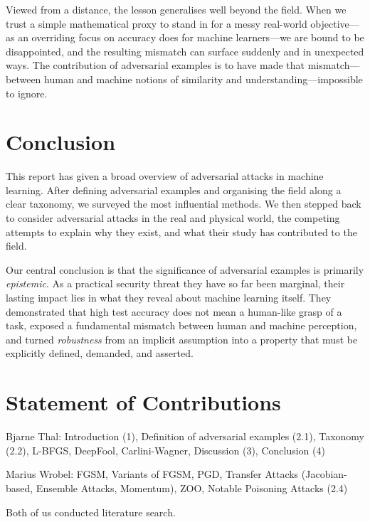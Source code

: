 \documentclass[review]{AIM_report}
\begin{document}
Viewed from a distance, the lesson generalises well beyond the field. When we trust a simple mathematical proxy to stand in for a messy real-world objective---as an overriding focus on accuracy does for machine learners---we are bound to be disappointed, and the resulting mismatch can surface suddenly and in unexpected ways. The contribution of adversarial examples is to have made that mismatch---between human and machine notions of similarity and understanding---impossible to ignore.

\section{Conclusion}

This report has given a broad overview of adversarial attacks in machine learning. After defining adversarial examples and organising the field along a clear taxonomy, we surveyed the most influential methods. We then stepped back to consider adversarial attacks in the real and physical world, the competing attempts to explain why they exist, and what their study has contributed to the field.

Our central conclusion is that the significance of adversarial examples is primarily \textit{epistemic}. As a practical security threat they have so far been marginal, their lasting impact lies in what they reveal about machine learning itself. They demonstrated that high test accuracy does not mean a human-like grasp of a task, exposed a fundamental mismatch between human and machine perception, and turned \textit{robustness} from an implicit assumption into a property that must be explicitly defined, demanded, and asserted.

\section*{Statement of Contributions}

Bjarne Thal: Introduction (1), Definition of adversarial examples (2.1), Taxonomy (2.2), L-BFGS, DeepFool, Carlini-Wagner, Discussion (3), Conclusion (4)

Marius Wrobel: FGSM, Variants of FGSM, PGD, Transfer Attacks (Jacobian-based, Ensemble Attacks, Momentum), ZOO, Notable Poisoning Attacks (2.4)

Both of us conducted literature search.

\printbibliography

\newpage
\pagestyle{empty}


\end{document}
